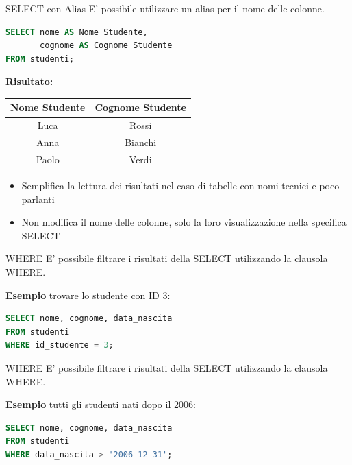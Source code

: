 \documentclass{beamer}
\begin{document}
\begin{frame}[fragile]{SELECT con Alias}
\small
E' possibile utilizzare un alias per il nome delle colonne.

\begin{lstlisting}[language=SQL]
SELECT nome AS Nome Studente, 
       cognome AS Cognome Studente
FROM studenti;
\end{lstlisting}

\medskip
\textbf{Risultato:}
\begin{center}
\begin{tabular}{|c|c|}
\hline
Nome Studente & Cognome Studente \\
\hline
Luca & Rossi \\
Anna & Bianchi \\
Paolo & Verdi \\
\hline
\end{tabular}
\end{center}

\medskip
\begin{itemize}
    \item Semplifica la lettura dei risultati nel caso di tabelle con nomi tecnici e poco parlanti
    \item Non modifica il nome delle colonne, solo la loro visualizzazione nella specifica SELECT
\end{itemize}
\end{frame}


\begin{frame}[fragile]{WHERE}
E' possibile filtrare i risultati della SELECT utilizzando la clausola WHERE. 

\bigskip
\textbf{Esempio} trovare lo studente con ID 3:

\begin{lstlisting}[language=SQL]
SELECT nome, cognome, data_nascita
FROM studenti
WHERE id_studente = 3;
\end{lstlisting}

\end{frame}

\begin{frame}[fragile]{WHERE}
E' possibile filtrare i risultati della SELECT utilizzando la clausola WHERE. 

\bigskip
\textbf{Esempio} tutti gli studenti nati dopo il 2006:

\begin{lstlisting}[language=SQL]
SELECT nome, cognome, data_nascita
FROM studenti
WHERE data_nascita > '2006-12-31';
\end{lstlisting}

\end{frame}
\end{document}
